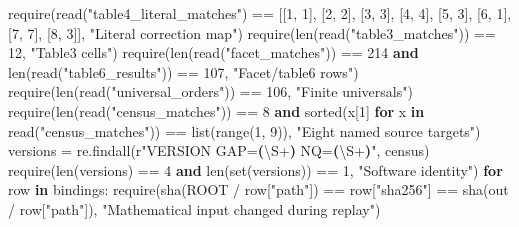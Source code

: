 \documentclass[
  10pt,
  letterpaper,
]{article}
\newenvironment{Shaded}{}{}
\newcommand{\BuiltInTok}[1]{\textcolor[rgb]{0.00,0.50,0.00}{#1}}
\newcommand{\ControlFlowTok}[1]{\textcolor[rgb]{0.00,0.44,0.13}{\textbf{#1}}}
\newcommand{\DecValTok}[1]{\textcolor[rgb]{0.25,0.63,0.44}{#1}}
\newcommand{\KeywordTok}[1]{\textcolor[rgb]{0.00,0.44,0.13}{\textbf{#1}}}
\newcommand{\NormalTok}[1]{#1}
\newcommand{\OperatorTok}[1]{\textcolor[rgb]{0.40,0.40,0.40}{#1}}
\newcommand{\StringTok}[1]{\textcolor[rgb]{0.25,0.44,0.63}{#1}}
\newcommand{\VerbatimStringTok}[1]{\textcolor[rgb]{0.25,0.44,0.63}{#1}}
\begin{document}
\begin{Shaded}
\begin{Highlighting}[]
\NormalTok{    require(read(}\StringTok{"table4\_literal\_matches"}\NormalTok{) }\OperatorTok{==}\NormalTok{ [[}\DecValTok{1}\NormalTok{, }\DecValTok{1}\NormalTok{], [}\DecValTok{2}\NormalTok{, }\DecValTok{2}\NormalTok{], [}\DecValTok{3}\NormalTok{, }\DecValTok{3}\NormalTok{], [}\DecValTok{4}\NormalTok{, }\DecValTok{4}\NormalTok{], [}\DecValTok{5}\NormalTok{, }\DecValTok{3}\NormalTok{], [}\DecValTok{6}\NormalTok{, }\DecValTok{1}\NormalTok{], [}\DecValTok{7}\NormalTok{, }\DecValTok{7}\NormalTok{], [}\DecValTok{8}\NormalTok{, }\DecValTok{3}\NormalTok{]], }\StringTok{"Literal correction map"}\NormalTok{)}
\NormalTok{    require(}\BuiltInTok{len}\NormalTok{(read(}\StringTok{"table3\_matches"}\NormalTok{)) }\OperatorTok{==} \DecValTok{12}\NormalTok{, }\StringTok{"Table3 cells"}\NormalTok{)}
\NormalTok{    require(}\BuiltInTok{len}\NormalTok{(read(}\StringTok{"facet\_matches"}\NormalTok{)) }\OperatorTok{==} \DecValTok{214} \KeywordTok{and} \BuiltInTok{len}\NormalTok{(read(}\StringTok{"table6\_results"}\NormalTok{)) }\OperatorTok{==} \DecValTok{107}\NormalTok{, }\StringTok{"Facet/table6 rows"}\NormalTok{)}
\NormalTok{    require(}\BuiltInTok{len}\NormalTok{(read(}\StringTok{"universal\_orders"}\NormalTok{)) }\OperatorTok{==} \DecValTok{106}\NormalTok{, }\StringTok{"Finite universals"}\NormalTok{)}
\NormalTok{    require(}\BuiltInTok{len}\NormalTok{(read(}\StringTok{"census\_matches"}\NormalTok{)) }\OperatorTok{==} \DecValTok{8} \KeywordTok{and} \BuiltInTok{sorted}\NormalTok{(x[}\DecValTok{1}\NormalTok{] }\ControlFlowTok{for}\NormalTok{ x }\KeywordTok{in}\NormalTok{ read(}\StringTok{"census\_matches"}\NormalTok{)) }\OperatorTok{==} \BuiltInTok{list}\NormalTok{(}\BuiltInTok{range}\NormalTok{(}\DecValTok{1}\NormalTok{, }\DecValTok{9}\NormalTok{)), }\StringTok{"Eight named source targets"}\NormalTok{)}
\NormalTok{    versions }\OperatorTok{=}\NormalTok{ re.findall(}\VerbatimStringTok{r"VERSION GAP=}\KeywordTok{(}\DecValTok{\textbackslash{}S}\OperatorTok{+}\KeywordTok{)}\VerbatimStringTok{ NQ=}\KeywordTok{(}\DecValTok{\textbackslash{}S}\OperatorTok{+}\KeywordTok{)}\VerbatimStringTok{"}\NormalTok{, census)}
\NormalTok{    require(}\BuiltInTok{len}\NormalTok{(versions) }\OperatorTok{==} \DecValTok{4} \KeywordTok{and} \BuiltInTok{len}\NormalTok{(}\BuiltInTok{set}\NormalTok{(versions)) }\OperatorTok{==} \DecValTok{1}\NormalTok{, }\StringTok{"Software identity"}\NormalTok{)}
    \ControlFlowTok{for}\NormalTok{ row }\KeywordTok{in}\NormalTok{ bindings:}
\NormalTok{        require(sha(ROOT }\OperatorTok{/}\NormalTok{ row[}\StringTok{"path"}\NormalTok{]) }\OperatorTok{==}\NormalTok{ row[}\StringTok{"sha256"}\NormalTok{] }\OperatorTok{==}\NormalTok{ sha(out }\OperatorTok{/}\NormalTok{ row[}\StringTok{"path"}\NormalTok{]), }\StringTok{"Mathematical input changed during replay"}\NormalTok{)}

\end{Highlighting}
\end{Shaded}
\end{document}
